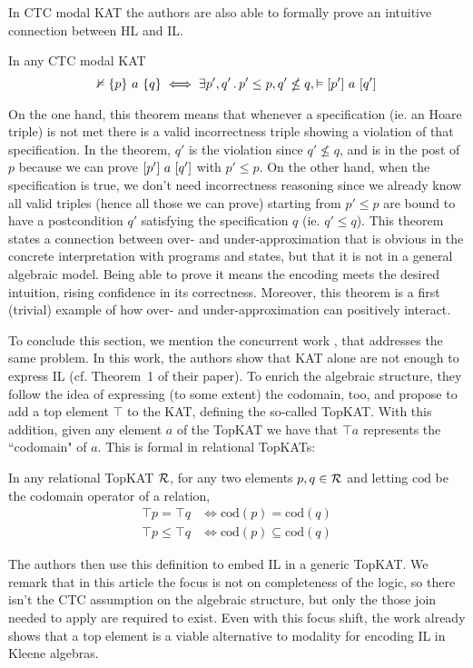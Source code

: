 In CTC modal KAT the authors are also able to formally prove an intuitive connection between HL and IL.
\begin{theorem}
	In any CTC modal KAT
	\[
	\nvDash \{p\}~a~\{q\} \iff \exists p', q' \,.\, p' \le p, q' \nleq q, \vDash [p']~a~[q']
	\]
\end{theorem}
On the one hand, this theorem means that whenever a specification (ie. an Hoare triple) is not met there is a valid incorrectness triple showing a violation of that specification. In the theorem, $q'$ is the violation since $q' \nleq q$, and is in the post of $p$ because we can prove $[p']~a~[q']$ with $p' \le p$.
On the other hand, when the specification is true, we don't need incorrectness reasoning since we already know all valid triples (hence all those we can prove) starting from $p' \le p$ are bound to have a postcondition $q'$ satisfying the specification $q$ (ie. $q' \le q$).
This theorem states a connection between over- and under-approximation that is obvious in the concrete interpretation with programs and states, but that it is not in a general algebraic model. Being able to prove it means the encoding meets the desired intuition, rising confidence in its correctness. Moreover, this theorem is a first (trivial) example of how over- and under-approximation can positively interact.

To conclude this section, we mention the concurrent work \cite{ZAG22}, that addresses the same problem. In this work, the authors show that KAT alone are not enough to express IL (cf. Theorem~1 of their paper). To enrich the algebraic structure, they follow the idea of expressing (to some extent) the codomain, too, and propose to add a top element $\top$ to the KAT, defining the so-called TopKAT.
With this addition, given any element $a$ of the TopKAT we have that $\top a$ represents the ``codomain" of $a$. This is formal in relational TopKATs:
\begin{prop}
	In any relational TopKAT $\mathcal{R}$, for any two elements $p, q \in \mathcal{R}$ and letting $\text{cod}$ be the codomain operator of a relation,
	\begin{align*}
		\top p = \top q   & \iff \text{cod}(p) = \text{cod}(q)         \\
		\top p \le \top q & \iff \text{cod}(p) \subseteq \text{cod}(q)
	\end{align*}
\end{prop}
The authors then use this definition to embed IL in a generic TopKAT.
We remark that in this article the focus is not on completeness of the logic, so there isn't the CTC assumption on the algebraic structure, but only the those join needed to apply  are required to exist. Even with this focus shift, the work already shows that a top element is a viable alternative to modality for encoding IL in Kleene algebras.

